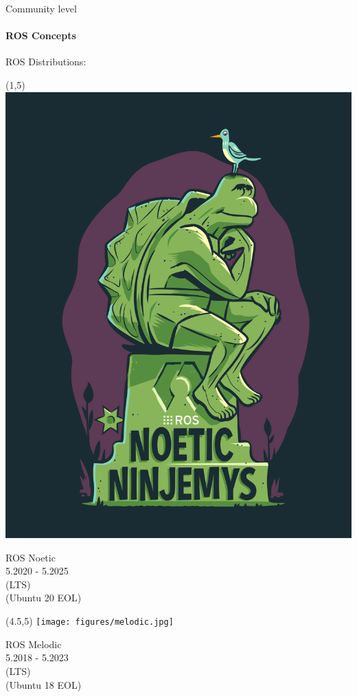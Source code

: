 \documentclass{beamer}
\begin{document}
\begin{frame}{Community level}
    \framesubtitle{ROS Concepts}
    {\huge ROS Distributions:}
    \vspace{7.0cm}
     \begin{textblock}{3}(1,5)
        \includegraphics[width = 1.0\linewidth]{figures/noetic.png}
        
        \centering
        ROS Noetic\\
        \footnotesize 5.2020 - 5.2025\\
        (LTS)\\
        (Ubuntu 20 EOL)
        
     \end{textblock}
     \begin{textblock}{3}(4.5,5)
         \texttt{[image: figures/melodic.jpg]}
         
         \centering
            ROS Melodic\\
         \footnotesize 5.2018 - 5.2023\\
            (LTS)\\
            (Ubuntu 18 EOL)
     \end{textblock}
     

\end{frame}
\end{document}
